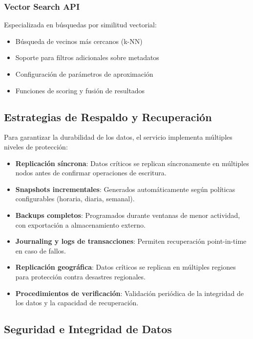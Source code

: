 \documentclass[12pt,a4paper]{article}
\begin{document}
\subsubsection{Vector Search API}
Especializada en búsquedas por similitud vectorial:
\begin{itemize}
    \item Búsqueda de vecinos más cercanos (k-NN)
    \item Soporte para filtros adicionales sobre metadatos
    \item Configuración de parámetros de aproximación
    \item Funciones de scoring y fusión de resultados
\end{itemize}

\subsection{Estrategias de Respaldo y Recuperación}
\label{subsec:ds-respaldo}

Para garantizar la durabilidad de los datos, el servicio implementa múltiples niveles de protección:

\begin{itemize}
    \item \textbf{Replicación síncrona}: Datos críticos se replican síncronamente en múltiples nodos antes de confirmar operaciones de escritura.
    
    \item \textbf{Snapshots incrementales}: Generados automáticamente según políticas configurables (horaria, diaria, semanal).
    
    \item \textbf{Backups completos}: Programados durante ventanas de menor actividad, con exportación a almacenamiento externo.
    
    \item \textbf{Journaling y logs de transacciones}: Permiten recuperación point-in-time en caso de fallos.
    
    \item \textbf{Replicación geográfica}: Datos críticos se replican en múltiples regiones para protección contra desastres regionales.
    
    \item \textbf{Procedimientos de verificación}: Validación periódica de la integridad de los datos y la capacidad de recuperación.
\end{itemize}

\subsection{Seguridad e Integridad de Datos}
\label{subsec:ds-seguridad}
\end{document}
